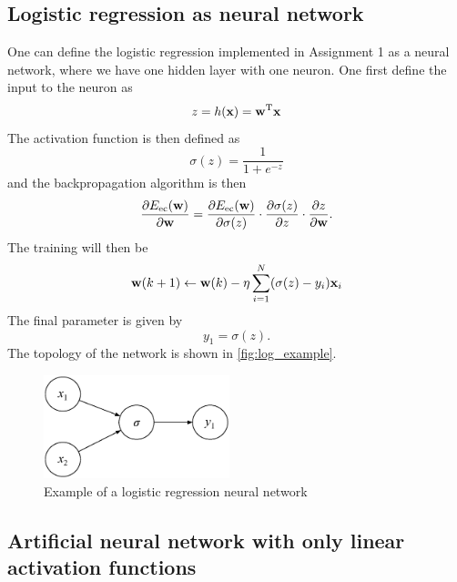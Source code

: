 \documentclass[../main.tex]{subfiles}
\begin{document}
\subsection{Logistic regression as neural network}
One can define the logistic regression implemented in Assignment 1 \cite{assignment1} as a neural network, where we have one hidden layer with one neuron. One first define the input to the neuron as
\begin{equation}
	z = h(\mathbf{x}) =\mathbf{w}^{\rm T} \mathbf{x} \label{eq:z}
\end{equation}
The activation function is then defined as
\begin{equation}
	\sigma(z)=\frac{1}{1+e^{-z}}
\end{equation}
and the backpropagation algorithm is then
\begin{equation}
	\frac{\partial E_{\rm ec}(\mathbf{w})}{\partial \mathbf{w}} = 
		\frac{\partial E_{\rm ec}(\mathbf{w})}{\partial \sigma(z)}
		\cdot \frac{\partial \sigma(z)}{\partial z}
		\cdot \frac{\partial z}{\partial \mathbf{w}}.
\end{equation}
The training will then be
\begin{equation}
	\mathbf{w}(k+1) \leftarrow \mathbf{w}(k) - \eta \sum_{i=1}^{N}(\sigma(z)-y_i)\mathbf{x}_i
\end{equation}
The final parameter is given by
\begin{equation}
	y_1 = \sigma(z).
\end{equation}
The topology of the network is shown in \autoref{fig:log_example}.

\begin{figure}
	\centering
    \includegraphics[height=3cm]{figures/theory/log_network}
    \caption{Example of a logistic regression neural network}
    \label{fig:log_example}
\end{figure}

\subsection{Artificial neural network with only linear activation functions}
\end{document}

